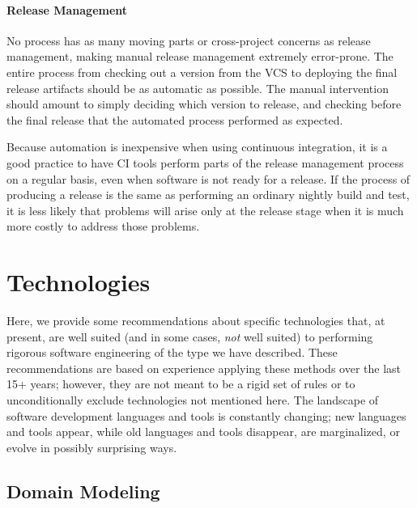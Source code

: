 \paragraph{Release Management}

No process has as many moving parts or cross-project concerns as
release management, making manual release management extremely
error-prone. The entire process from checking out a version from the
VCS to deploying the final release artifacts should be as automatic as
possible. The manual intervention should amount to simply deciding
which version to release, and checking before the final release that
the automated process performed as expected.

Because automation is inexpensive when using continuous integration,
it is a good practice to have CI tools perform parts of the release
management process on a regular basis, even when software is not ready
for a release. If the process of producing a release is the same as
performing an ordinary nightly build and test, it is less likely that
problems will arise only at the release stage when it is much more
costly to address those problems.

\section{Technologies}
\label{sec:technologies}

Here, we provide some recommendations about specific technologies
that, at present, are well suited (and in some cases, \emph{not} well
suited) to performing rigorous software engineering of the type we
have described. These recommendations are based on experience applying
these methods over the last 15+ years; however, they are not meant to
be a rigid set of rules or to unconditionally exclude technologies not
mentioned here. The landscape of software development languages and
tools is constantly changing; new languages and tools appear, while
old languages and tools disappear, are marginalized, or evolve in
possibly surprising ways.

\subsection{Domain Modeling}

